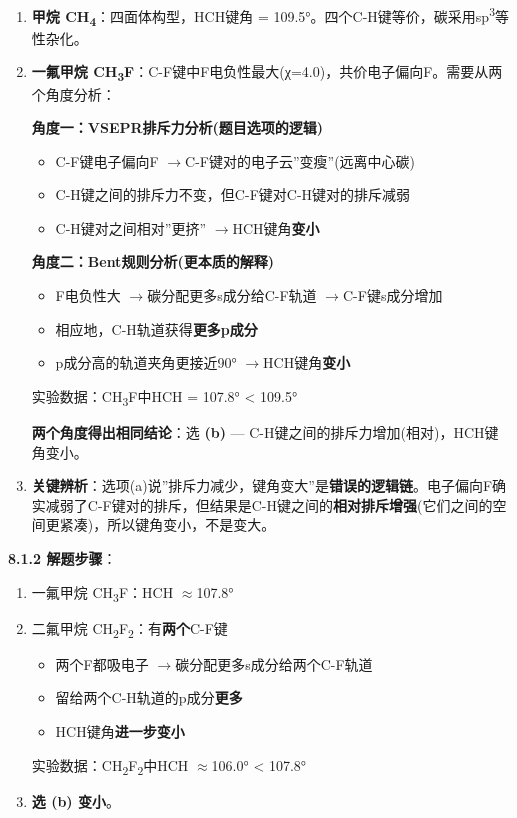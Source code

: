 \documentclass[a4paper,11pt]{ctexart}
\providecommand{\tightlist}{\setlength{\itemsep}{0pt}\setlength{\parskip}{0pt}}
\newcommand{\箭}{\ensuremath{\rightarrow}}
\newcommand{\左箭}{\ensuremath{\leftarrow}}
\newcommand{\上箭}{\ensuremath{\uparrow}}
\newcommand{\下箭}{\ensuremath{\downarrow}}
\newcommand{\衡}{\ensuremath{\rightleftharpoons}}
\newcommand{\双箭}{\ensuremath{\leftrightarrow}}
\newcommand{\约等于}{\ensuremath{\approx}}
\newcommand{\小于等于}{\ensuremath{\leq}}
\newcommand{\大于等于}{\ensuremath{\geq}}
\newcommand{\不等于}{\ensuremath{\neq}}
\newcommand{\西格马}{\ensuremath{\sigma}}
\newcommand{\派}{\ensuremath{\pi}}
\begin{document}
\begin{enumerate}
\def\labelenumi{\arabic{enumi}.}
\item
  \textbf{甲烷 CH\textsubscript{4}}：四面体构型，HCH键角 = 109.5°。四个C-H键等价，碳采用sp\textsuperscript{3}等性杂化。
\item
  \textbf{一氟甲烷 CH\textsubscript{3}F}：C-F键中F电负性最大(χ=4.0)，共价电子偏向F。需要从两个角度分析：

  \textbf{角度一：VSEPR排斥力分析(题目选项的逻辑)}

  \begin{itemize}
  \tightlist
  \item
    C-F键电子偏向F \箭 C-F键对的电子云''变瘦''(远离中心碳)
  \item
    C-H键之间的排斥力不变，但C-F键对C-H键对的排斥减弱
  \item
    C-H键对之间相对''更挤'' \箭 HCH键角\textbf{变小}
  \end{itemize}

  \textbf{角度二：Bent规则分析(更本质的解释)}

  \begin{itemize}
  \tightlist
  \item
    F电负性大 \箭 碳分配更多s成分给C-F轨道 \箭 C-F键s成分增加
  \item
    相应地，C-H轨道获得\textbf{更多p成分}
  \item
    p成分高的轨道夹角更接近90° \箭 HCH键角\textbf{变小}
  \end{itemize}

  实验数据：CH\textsubscript{3}F中HCH = 107.8° \textless{} 109.5°

  \textbf{两个角度得出相同结论}：选 \textbf{(b)} --- C-H键之间的排斥力增加(相对)，HCH键角变小。
\item
  \textbf{关键辨析}：选项(a)说''排斥力减少，键角变大''是\textbf{错误的逻辑链}。电子偏向F确实减弱了C-F键对的排斥，但结果是C-H键之间的\textbf{相对排斥增强}(它们之间的空间更紧凑)，所以键角变小，不是变大。
\end{enumerate}

\textbf{8.1.2 解题步骤}：

\begin{enumerate}
\def\labelenumi{\arabic{enumi}.}
\item
  一氟甲烷 CH\textsubscript{3}F：HCH \约等于 107.8°
\item
  二氟甲烷 CH\textsubscript{2}F\textsubscript{2}：有\textbf{两个}C-F键

  \begin{itemize}
  \tightlist
  \item
    两个F都吸电子 \箭 碳分配更多s成分给两个C-F轨道
  \item
    留给两个C-H轨道的p成分\textbf{更多}
  \item
    HCH键角\textbf{进一步变小}
  \end{itemize}

  实验数据：CH\textsubscript{2}F\textsubscript{2}中HCH \约等于 106.0° \textless{} 107.8°
\item
  \textbf{选 (b) 变小}。
\end{enumerate}
\end{document}
